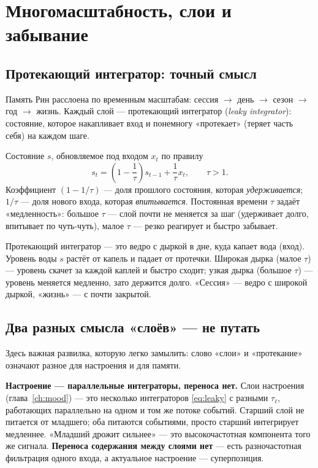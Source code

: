 \chapter{Многомасштабность, слои и забывание}
\label{ch:timescales}

\section{Протекающий интегратор: точный смысл}

Память Рин расслоена по временным масштабам: сессия $\to$ день $\to$ сезон
$\to$ год $\to$ жизнь. Каждый слой --- протекающий интегратор
(\textit{leaky integrator}): состояние, которое накапливает вход и понемногу
«протекает» (теряет часть себя) на каждом шаге.

\begin{definition}
Состояние $s$, обновляемое под входом $x_t$ по правилу
\begin{equation}
s_t = \left(1 - \frac{1}{\tau}\right)s_{t-1} + \frac{1}{\tau}x_t,
\qquad \tau > 1.
\label{eq:leaky}
\end{equation}
Коэффициент $(1 - 1/\tau)$ --- доля прошлого состояния, которая
\emph{удерживается}; $1/\tau$ --- доля нового входа, которая \emph{впитывается}.
Постоянная времени $\tau$ задаёт «медленность»: большое $\tau$ --- слой почти
не меняется за шаг (удерживает долго, впитывает по чуть-чуть), малое $\tau$ ---
резко реагирует и быстро забывает.
\end{definition}

\begin{intuition}
Протекающий интегратор --- это ведро с дыркой в дне, куда капает вода (вход).
Уровень воды $s$ растёт от капель и падает от протечки. Широкая дырка
(малое $\tau$) --- уровень скачет за каждой каплей и быстро сходит; узкая
дырка (большое $\tau$) --- уровень меняется медленно, зато держится долго.
«Сессия» --- ведро с широкой дыркой, «жизнь» --- с почти закрытой.
\end{intuition}

\section{Два разных смысла «слоёв» --- не путать}
\label{sec:twolayers}

Здесь важная развилка, которую легко замылить: слово «слои» и «протекание»
означают разное для настроения и для памяти.

\smallskip\noindent\textbf{Настроение --- параллельные интеграторы, переноса нет.}
Слои настроения (глава~\ref{ch:mood}) --- это несколько интеграторов
\eqref{eq:leaky} с разными $\tau_\ell$, работающих параллельно на одном и том
же потоке событий. Старший слой не питается от младшего; оба питаются
событиями, просто старший интегрирует медленнее. «Младший дрожит сильнее» ---
это высокочастотная компонента того же сигнала. \textbf{Переноса содержания
между слоями нет} --- есть разночастотная фильтрация одного входа, а
актуальное настроение --- суперпозиция.

